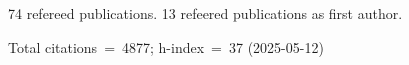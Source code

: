 74 refereed publications. 13 refeered publications as first author.

Total citations~=~4877; h-index~=~37 (2025-05-12)